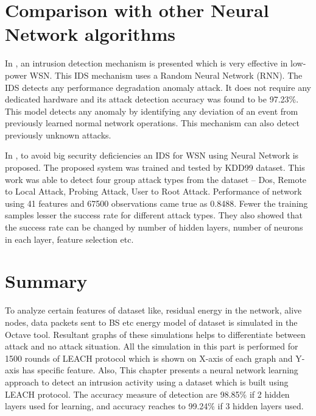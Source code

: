 \section{Comparison with other Neural Network algorithms}
In \cite{saeed2016random}, an intrusion detection mechanism is presented which is very effective in low-power WSN. This IDS mechanism uses a Random Neural Network (RNN). The IDS detects any performance degradation anomaly attack. It does not require any dedicated hardware and its attack detection accuracy was found to be 97.23\%. This model detects any anomaly by identifying any deviation of an event from previously learned normal network operations. This mechanism can also detect previously unknown attacks.
\par
In \cite{Turkish2015ANN}, to avoid big security deficiencies an IDS for WSN using Neural Network is proposed. The proposed system was trained and tested by KDD99 dataset. This work was able to detect four group attack types from the dataset – Dos, Remote to Local Attack, Probing Attack, User to Root Attack. Performance of network using 41 features and 67500 observations came true as 0.8488. Fewer the training samples lesser the success rate for different attack types. They also showed that the success rate can be changed by number of hidden layers, number of neurons in each layer, feature selection etc.

\section{Summary}
To analyze certain features of dataset like, residual energy in the network, alive nodes, data packets sent to BS etc energy model of dataset is simulated in the Octave tool. Resultant graphs of these simulations helps to differentiate between attack and no attack situation. All the simulation in this part is performed for 1500 rounds of LEACH protocol which is shown on X-axis of each graph and Y-axis has specific feature. Also, This chapter presents a neural network learning approach to detect an intrusion activity using a dataset which is built using LEACH protocol. The accuracy measure of detection are 98.85\% if 2 hidden layers used for learning, and accuracy reaches to 99.24\% if 3 hidden layers used.